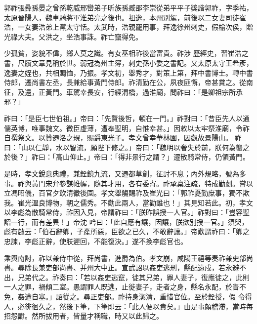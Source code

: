 
\begin{pinyinscope}

 郭祚張彞孫晏之曾孫乾威邢巒弟子昕族孫臧邵李崇從弟平平子獎諧郭祚，字季祐，太原晉陽人，魏車騎將軍淮弟亮之後也。祖逸，本州別駕，前後以二女妻司徒崔浩，一女妻浩弟上黨太守恬。太武時，浩親寵用事，拜逸徐州刺史，假榆次侯，贈光祿大夫。父洪之，坐浩事誅。祚亡竄得免。



 少孤貧，姿貌不偉，鄉人莫之識。有女巫相祚後當富貴。祚涉
 歷經史，習崔浩之書，尺牘文章見稱於世。弱冠為州主簿，刺史孫小委之書記。又太原太守王希彥，逸妻之姪也，共相賙恤，乃振。孝文初，舉秀才，對策上第，拜中書博士。轉中書侍郎，遷尚書左丞，長兼給事黃門侍郎。祚清勤在公，夙夜匪懈，帝甚賞之。從南征，及還，正黃門。車駕幸長安，行經渭橋，過淮廟，問祚曰：「是卿祖宗所承邪？」



 祚曰：「是臣七世伯祖。」帝曰：「先賢後哲，頓在一門。」祚對曰：「昔臣先人以通儒英博，唯事魏文。微臣虛薄，遭奉聖明，自惟幸甚。」因敕以太牢祭淮廟，令祚自撰祭文。以贊遷洛之規，賜爵東光子。孝文曾幸華林園，因觀故景陽山。
 祚曰：「山以仁靜，水以智流，願陛下修之。」帝曰：「魏明以奢失於前，朕何為襲之於後？」祚曰：「高山仰止。」帝曰：「得非景行之謂？」遷散騎常侍，仍領黃門。



 是時，孝文銳意典禮，兼銓鏡九流，又遷都草創，征討不息；內外規略，號為多事。祚與黃門宋弁參謀帷幄，隨其才用，各有委寄。祚承稟注疏，特成勤劇。嘗以立馮昭儀，百官夕飲清徽後園。孝文舉觴賜祚及崔光曰：「郭祚憂勤庶事，獨不欺我。崔光溫良博物，朝之儒秀。不勸此兩人，當勸誰也！」其見知若此。初，孝文以李彪為散騎常侍，祚因入見，帝謂祚曰：「朕昨誤授一人官。」祚對曰：「豈容聖詔一行，而有差異！」帝沈
 吟曰：「此自應有讓，因讓，朕欲別授一官。」須臾，彪有啟云：「伯石辭卿，子產所惡，臣欲之已久，不敢辭讓。」帝歎謂祚曰：「卿之忠諫，李彪正辭，使朕遲回，不能復決。」遂不換李彪官也。



 乘輿南討，祚以兼侍中從，拜尚書，進爵為伯。孝文崩，咸陽王禧等奏祚兼吏部尚書。尋除長兼吏部尚書、并州大中正。宣武詔以姦吏逃刑，縣配遠戍，若永避不出，兄弟代之。祚奏曰：「若以姦吏逃竄，徙其兄弟，罪人妻子，復應徙之，此則一人之罪，禍傾二室。愚謂罪人既逃，止徙妻子，走者之身，縣名永配，於眚不免，姦途自塞。」詔從之。尋正吏部。祚持身潔清，重惜官位。至於銓授，假
 令得人，必徘徊久之，然後下筆，下筆即云：「此人便以貴矣。」由是事頗稽滯，當時每招怨讟。然所拔用者，皆量才稱職，時又以此歸之。




\end{pinyinscope}

